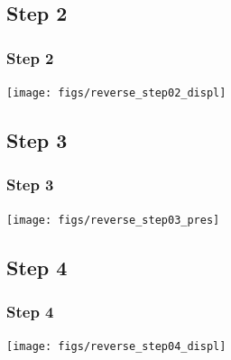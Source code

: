 \documentclass[aspectratio=169]{beamer}
\begin{document}
\subsection{Step 2}

\begin{frame}
  \frametitle{Step 2}

  \vfill
  \begin{center}
      \texttt{[image: figs/reverse\_step02\_displ]}
  \end{center}
\vfill
      
\end{frame}


\subsection{Step 3}

\begin{frame}
  \frametitle{Step 3}

  \vfill
  \begin{center}
      \texttt{[image: figs/reverse\_step03\_pres]}
  \end{center}
\vfill
      
\end{frame}


\subsection{Step 4}

\begin{frame}
  \frametitle{Step 4}

  \vfill
  \begin{center}
      \texttt{[image: figs/reverse\_step04\_displ]}
  \end{center}
\vfill
      
\end{frame}


\end{document}
